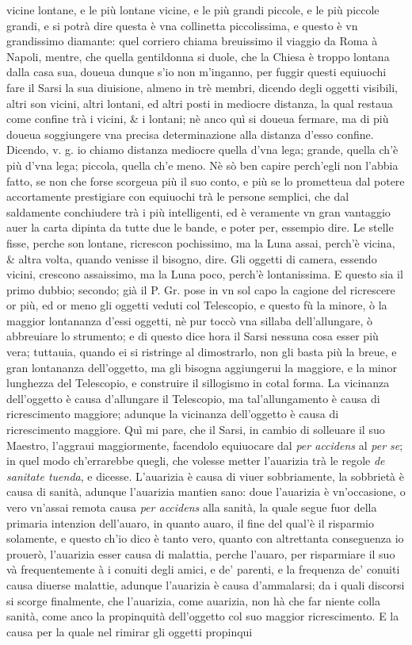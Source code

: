 \documentclass[11pt,twoside,openany]{book}
\begin{document}
vicine lontane, e le più lontane vicine, e le più grandi piccole, e le più piccole grandi, e si potrà dire questa è vna collinetta piccolissima, e questo è vn grandissimo diamante: quel corriero chiama breuissimo il viaggio da Roma à Napoli, mentre, che quella gentildonna si duole, che la Chiesa è troppo lontana dalla casa sua, doueua dunque s'io non m'inganno, per fuggir questi equiuochi fare il Sarsi la sua diuisione, almeno in trè membri, dicendo degli oggetti visibili, altri son vicini, altri lontani, ed altri posti in mediocre distanza, la qual restaua come confine trà i vicini, \& i lontani; nè anco quì si doueua fermare, ma di più doueua soggiungere vna precisa determinazione alla distanza d'esso confine. Dicendo, v. g. io chiamo distanza mediocre quella d'vna lega; grande, quella ch'è più d'vna lega; piccola, quella ch'e meno. Nè sò ben capire perch'egli non l'abbia fatto, se non che forse scorgeua più il suo conto, e più se lo prometteua dal potere accortamente prestigiare con equiuochi trà le persone semplici, che dal saldamente conchiudere trà i più intelligenti, ed è veramente vn gran vantaggio auer la carta dipinta da tutte due le bande, e poter per, essempio dire. Le stelle fisse, perche son lontane, ricrescon pochissimo, ma la Luna assai, perch'è vicina, \& altra volta, quando venisse il bisogno, dire. Gli oggetti di camera, essendo vicini, crescono assaissimo, ma la Luna poco, perch'è lontanissima. E questo sia il primo dubbio; secondo; già il P. Gr. pose in vn sol capo la cagione del ricrescere or più, ed or meno gli oggetti veduti col Telescopio, e questo fù la minore, ò la maggior lontananza d'essi oggetti, nè pur toccò vna sillaba dell'allungare, ò abbreuiare lo strumento; e di questo dice hora il Sarsi nessuna cosa esser più vera; tuttauia, quando ei si ristringe al dimostrarlo, non gli basta più la breue, e gran lontananza dell'oggetto, ma gli bisogna aggiungerui la maggiore, e la minor lunghezza del Telescopio, e construire il sillogismo in cotal forma. La vicinanza dell'oggetto è causa d'allungare il Telescopio, ma tal'allungamento è causa di ricrescimento maggiore; adunque la vicinanza dell'oggetto è causa di ricrescimento maggiore. Quì mi pare, che il Sarsi, in cambio di solleuare il suo Maestro, l'aggraui maggiormente, facendolo equiuocare dal \textit{per accidens} al \textit{per se}; in quel modo ch'errarebbe quegli, che volesse metter l'auarizia trà le regole \textit{de sanitate tuenda}, e dicesse. L'auarizia è causa di viuer sobbriamente, la sobbrietà è causa di sanità, adunque l'auarizia mantien sano: doue l'auarizia è vn'occasione, o vero vn'assai remota causa \textit{per accidens} alla sanità, la quale segue fuor della primaria intenzion dell'auaro, in quanto auaro, il fine del qual'è il risparmio solamente, e questo ch'io dico è tanto vero, quanto con altrettanta conseguenza io prouerò, l'auarizia esser causa di malattia, perche l'auaro, per risparmiare il suo và frequentemente à i conuiti degli amici, e de' parenti, e la frequenza de' conuiti causa diuerse malattie, adunque l'auarizia è causa d'ammalarsi; da i quali discorsi si scorge finalmente, che l'auarizia, come auarizia, non hà che far niente colla sanità, come anco la propinquità dell'oggetto col suo maggior ricrescimento. E la causa per la quale nel rimirar gli oggetti propinqui 
\end{document}
